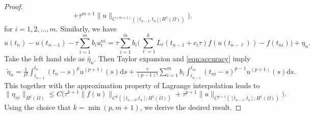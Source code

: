 \documentclass[10pt,final,leqno,onefignum,onetabnum]{siamltex}%
\def\d{\textrm{d}}
\def\leq{\leqslant}
\def\d{\mathrm{d}}
\def\II{(\Omega)}
\begin{document}
\begin{proof}
\begin{equation*}
    + \tau^{m+1} \|u\|_{C^{(m+1)}([t_{n-1},t_n];H^1(\Omega))} \Big). %
\end{equation*}
for $i=1,2,\dots,m$. Similarly, we have
\begin{equation*}
    u(t_{n}) -  u(t_{n-1}) -\tau\sum_{i=1}^m b_i  u_t^{ni} =
    \tau \sum_{i=1}^m b_i  \Big(\sum_{\ell=1}^k L_{\ell}(t_{n-1}+c_i\tau) f(u(t_{n-\ell})) - f(t_{ni})\Big)  +
    \eta_{n}.
\end{equation*}
Take the left hand side as $\tilde{\eta_n}$. Then Taylor expansion and \eqref{eqn:accuracy} imply
\begin{equation*}
\begin{aligned}
\tilde\eta_{n} =\frac1{p!}\int_{t_{n-1}}^{t_n} (t_n-s)^p u^{(p+1)}(s) \d s
+ \frac\tau{(p-1)!}\sum_{i=1}^mb_i\int_{t_{n-1}}^{t_{ni}}
(t_{ni}-s)^{p-1} u^{(p+1)}(s) \d s.
\end{aligned}
\end{equation*}
This together with the approximation property of Lagrange interpolation leads to
\begin{equation*}
     \|\eta_{ni}\|_{H^1(\Omega)} \leq C\Big(\tau^{k+1} \| f(u)  \|_{C^{k}([t_{n-k},t_n]; H^1\II)}
    + \tau^{p+1} \|u \|_{C^{p+1}([t_{n-1},t_n];H^1(\Omega))} \Big).
\end{equation*}
Using the choice that $k=\min(p, m+1)$, we derive the desired result.
\end{proof}












 


\end{document}
